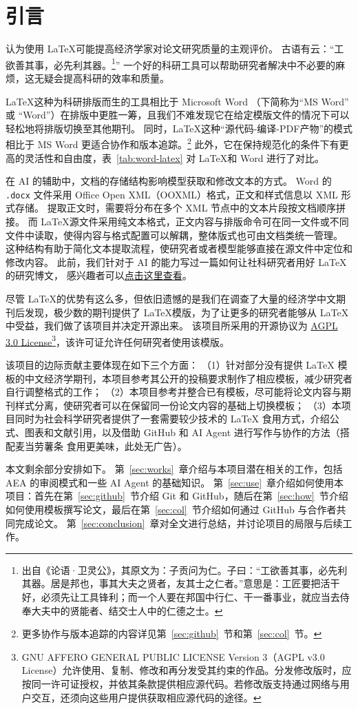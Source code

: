 \section{引言}
\label{sec:intro}
\textcite{james_does_2026} 认为使用 \LaTeX 可能提高经济学家对论文研究质量的主观评价。
古语有云：“工欲善其事，必先利其器。\footnote{出自《论语·卫灵公》，其原文为：子贡问为仁。子曰：“工欲善其事，必先利其器。居是邦也，事其大夫之贤者，友其士之仁者。”意思是：工匠要把活干好，必须先让工具锋利；而一个人要在邦国中行仁、干一番事业，就应当去侍奉大夫中的贤能者、结交士人中的仁德之士。}”
一个好的科研工具可以帮助研究者解决中不必要的麻烦，这无疑会提高科研的效率和质量。

\LaTeX 这种为科研排版而生的工具相比于 Microsoft Word （下简称为“MS Word” 或 “Word”）在排版中更胜一筹，且我们不难发现它在给定模版文件的情况下可以轻松地将排版切换至其他期刊。
同时，\LaTeX 这种“源代码-编译-PDF产物”的模式相比于 MS Word 更适合协作和版本追踪。\footnote{更多协作与版本追踪的内容详见第~\ref{sec:github}~节和第~\ref{sec:col}~节。}
此外，它在保持规范化的条件下有更高的灵活性和自由度，表~\ref{tab:word-latex} 对 \LaTeX 和 Word 进行了对比。



在 AI 的辅助中，文档的存储结构影响模型获取和修改文本的方式。
Word 的 \texttt{.docx} 文件采用 Office Open XML（OOXML）格式，正文和样式信息以 XML 形式存储。
提取正文时，需要将分布在多个 XML 节点中的文本片段按文档顺序拼接。
而 \LaTeX 源文件采用纯文本格式，正文内容与排版命令可在同一文件或不同文件中读取，使得内容与格式配置可以解耦，整体版式也可由文档类统一管理。
这种结构有助于简化文本提取流程，使研究者或者模型能够直接在源文件中定位和修改内容。
此前，我们针对于 AI 的能力写过一篇如何让社科研究者用好 \LaTeX 的研究博文，
感兴趣者可以\href{https://marx-max.aidea-labs.com/blog/2026-10-26-latex-guide-social-scientists/}{点击这里查看}。

尽管 \LaTeX 的优势有这么多，但依旧遗憾的是我们在调查了大量的经济学中文期刊后发现，极少数的期刊提供了 \LaTeX 模版，为了让更多的研究者能够从 \LaTeX 中受益，我们做了该项目并决定开源出来。
该项目所采用的开源协议为 \href{https://github.com/aidea-labs/econ-sbm-template?tab=AGPL-3.0-1-ov-file}{AGPL 3.0 License}\footnote{GNU AFFERO GENERAL PUBLIC LICENSE Version 3（AGPL v3.0 License）允许使用、复制、修改和再分发受其约束的作品。分发修改版时，应按同一许可证授权，并依其条款提供相应源代码。若修改版支持通过网络与用户交互，还须向这些用户提供获取相应源代码的途径。}，该许可证允许任何研究者使用该模版。

该项目的边际贡献主要体现在如下三个方面：
（1）针对部分没有提供 \LaTeX{} 模板的中文经济学期刊，本项目参考其公开的投稿要求制作了相应模板，减少研究者自行调整格式的工作；
（2）本项目参考并整合已有模板，尽可能将论文内容与期刊样式分离，使研究者可以在保留同一份论文内容的基础上切换模板；
（3）本项目同时为社会科学研究者提供了一套需要较少技术的 \LaTeX{} 食用方式，介绍公式、图表和文献引用，以及借助 GitHub 和 AI Agent 进行写作与协作的方法（搭配麦当劳薯条  食用更美味，此处无广告）。

本文剩余部分安排如下。
第~\ref{sec:works}~章介绍与本项目潜在相关的工作，包括 AEA 的审阅模式和一些 AI Agent 的基础知识。
第~\ref{sec:use}~章介绍如何使用本项目：首先在第~\ref{sec:github}~节介绍 Git 和 GitHub，随后在第~\ref{sec:how}~节介绍如何使用模板撰写论文，最后在第~\ref{sec:col}~节介绍如何通过 GitHub 与合作者共同完成论文。
第~\ref{sec:conclusion}~章对全文进行总结，并讨论项目的局限与后续工作。
